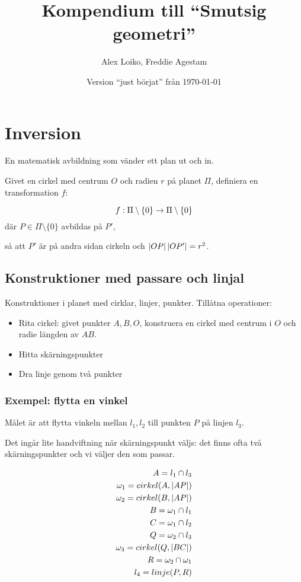 \documentclass[10pt,a4paper]{article}
\author{Alex Loiko, Freddie Agestam}
\title{Kompendium till ``Smutsig geometri''}
\date{Version ``just börjat'' från \today}
\begin{document}


\maketitle

\section{Inversion}
En matematisk avbildning som vänder ett plan ut och in.

Givet en cirkel med centrum $O$ och radien $r$ på planet $\Pi$, definiera en transformation $f$:

\[ f: \Pi \setminus \{ 0 \} \rightarrow \Pi \setminus \{ 0 \} \]
där $P \in \Pi \setminus \{ 0 \}$ avbildas på $P'$,

så att $P'$ är på andra sidan cirkeln och $\left|OP\right| \left|OP'\right| = r^2$.

\subsection{Konstruktioner med passare och linjal}
Konstruktioner i planet med cirklar, linjer, punkter. Tillåtna operationer:

\begin{itemize}
\item Rita cirkel: givet punkter $A,B,O$, konstruera en cirkel med centrum i $O$ och radie längden av $AB$.
\item Hitta skärningspunkter
\item Dra linje genom två punkter
\end{itemize}

\subsubsection{Exempel: flytta en vinkel}
Målet är att flytta vinkeln mellan $l_1,l_2$ till punkten $P$ på linjen $l_3$.


Det ingår lite handviftning när skärningspunkt väljs: det finns ofta två skärningspunkter och vi väljer den som passar.

\begin{eqnarray*}
A = l_1 \cap l_3 \\
\omega_1 = cirkel(A, \left|AP\right|) \\
\omega_2 = cirkel(B, \left|AP\right|) \\
B = \omega_1 \cap l_1 \\
C = \omega_1 \cap l_2 \\
Q = \omega_2 \cap l_3 \\
\omega_3 = cirkel(Q, \left|BC\right|) \\
R = \omega_2 \cap \omega_1 \\
l_4 = linje(P,R)
\end{eqnarray*}
\end{document}
